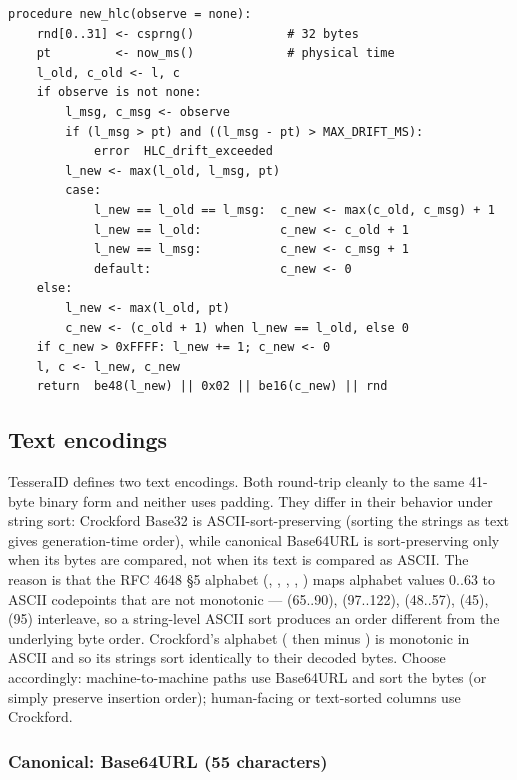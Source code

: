 \begin{lstlisting}[language=Pseudocode,caption={HLC TesseraID generation (with optional peer observation)},label={lst:gen-hlc}]
procedure new_hlc(observe = none):
    rnd[0..31] <- csprng()             # 32 bytes
    pt         <- now_ms()             # physical time
    l_old, c_old <- l, c
    if observe is not none:
        l_msg, c_msg <- observe
        if (l_msg > pt) and ((l_msg - pt) > MAX_DRIFT_MS):
            error  HLC_drift_exceeded
        l_new <- max(l_old, l_msg, pt)
        case:
            l_new == l_old == l_msg:  c_new <- max(c_old, c_msg) + 1
            l_new == l_old:           c_new <- c_old + 1
            l_new == l_msg:           c_new <- c_msg + 1
            default:                  c_new <- 0
    else:
        l_new <- max(l_old, pt)
        c_new <- (c_old + 1) when l_new == l_old, else 0
    if c_new > 0xFFFF: l_new += 1; c_new <- 0
    l, c <- l_new, c_new
    return  be48(l_new) || 0x02 || be16(c_new) || rnd
\end{lstlisting}

\subsection{Text encodings}

TesseraID defines two text encodings. Both round-trip cleanly to the same 41-byte binary form and neither uses padding. They differ in their behavior under string sort: Crockford Base32 \citep{crockford} is ASCII-sort-preserving (sorting the strings as text gives generation-time order), while canonical Base64URL is sort-preserving only when its bytes are compared, not when its text is compared as ASCII. The reason is that the RFC 4648 §5 alphabet \citep{rfc4648} (, , , \code{-}, \code{\_}) maps alphabet values 0..63 to ASCII codepoints that are not monotonic ---  (65..90),  (97..122),  (48..57), \code{-} (45), \code{\_} (95) interleave, so a string-level ASCII sort produces an order different from the underlying byte order. Crockford's alphabet ( then  minus ) is monotonic in ASCII and so its strings sort identically to their decoded bytes. Choose accordingly: machine-to-machine paths use Base64URL and sort the bytes (or simply preserve insertion order); human-facing or text-sorted columns use Crockford.

\subsubsection{Canonical: Base64URL (55 characters)}


